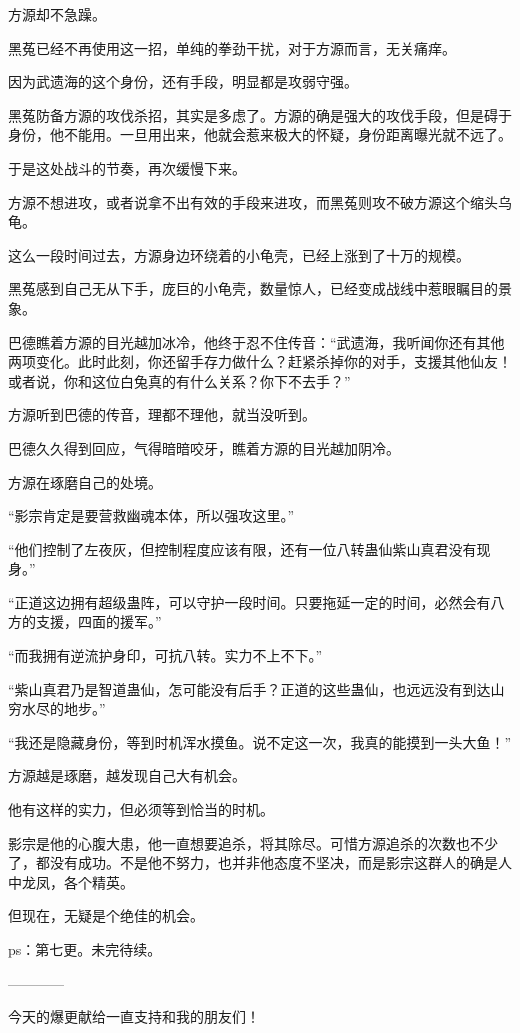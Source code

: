\begin{this_body}
方源却不急躁。

黑菟已经不再使用这一招，单纯的拳劲干扰，对于方源而言，无关痛痒。

因为武遗海的这个身份，还有手段，明显都是攻弱守强。

黑菟防备方源的攻伐杀招，其实是多虑了。方源的确是强大的攻伐手段，但是碍于身份，他不能用。一旦用出来，他就会惹来极大的怀疑，身份距离曝光就不远了。

于是这处战斗的节奏，再次缓慢下来。

方源不想进攻，或者说拿不出有效的手段来进攻，而黑菟则攻不破方源这个缩头乌龟。

这么一段时间过去，方源身边环绕着的小龟壳，已经上涨到了十万的规模。

黑菟感到自己无从下手，庞巨的小龟壳，数量惊人，已经变成战线中惹眼瞩目的景象。

巴德瞧着方源的目光越加冰冷，他终于忍不住传音：“武遗海，我听闻你还有其他两项变化。此时此刻，你还留手存力做什么？赶紧杀掉你的对手，支援其他仙友！或者说，你和这位白兔真的有什么关系？你下不去手？”

方源听到巴德的传音，理都不理他，就当没听到。

巴德久久得到回应，气得暗暗咬牙，瞧着方源的目光越加阴冷。

方源在琢磨自己的处境。

“影宗肯定是要营救幽魂本体，所以强攻这里。”

“他们控制了左夜灰，但控制程度应该有限，还有一位八转蛊仙紫山真君没有现身。”

“正道这边拥有超级蛊阵，可以守护一段时间。只要拖延一定的时间，必然会有八方的支援，四面的援军。”

“而我拥有逆流护身印，可抗八转。实力不上不下。”

“紫山真君乃是智道蛊仙，怎可能没有后手？正道的这些蛊仙，也远远没有到达山穷水尽的地步。”

“我还是隐藏身份，等到时机浑水摸鱼。说不定这一次，我真的能摸到一头大鱼！”

方源越是琢磨，越发现自己大有机会。

他有这样的实力，但必须等到恰当的时机。

影宗是他的心腹大患，他一直想要追杀，将其除尽。可惜方源追杀的次数也不少了，都没有成功。不是他不努力，也并非他态度不坚决，而是影宗这群人的确是人中龙凤，各个精英。

但现在，无疑是个绝佳的机会。

ps：第七更。未完待续。

------------

今天的爆更献给一直支持和我的朋友们！


\end{this_body}

